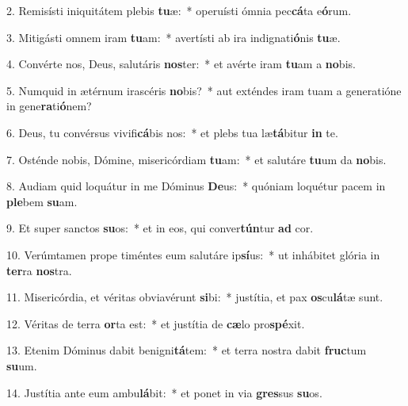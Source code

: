2. Remisísti iniquitátem plebis \textbf{tu}æ:~*  operuísti ómnia pec\textbf{cá}ta e\textbf{ó}rum.\

3. Mitigásti omnem iram \textbf{tu}am:~*  avertísti ab ira indignati\textbf{ó}nis \textbf{tu}æ.\

4. Convérte nos, Deus, salutáris \textbf{nos}ter:~*  et avérte iram \textbf{tu}am a \textbf{no}bis.\

5. Numquid in ætérnum irascéris \textbf{no}bis?~*  aut exténdes iram tuam a generatióne in gene\textbf{ra}ti\textbf{ó}nem?\

6. Deus, tu convérsus vivifi\textbf{cá}bis nos:~*  et plebs tua læ\textbf{tá}bitur \textbf{in} te.\

7. Osténde nobis, Dómine, misericórdiam \textbf{tu}am:~*  et salutáre \textbf{tu}um da \textbf{no}bis.\

8. Audiam quid loquátur in me Dóminus \textbf{De}us:~*  quóniam loquétur pacem in \textbf{ple}bem \textbf{su}am.\

9. Et super sanctos \textbf{su}os:~*  et in eos, qui conver\textbf{tún}tur \textbf{ad} cor.\

10. Verúmtamen prope timéntes eum salutáre ip\textbf{sí}us:~*  ut inhábitet glória in \textbf{ter}ra \textbf{nos}tra.\

11. Misericórdia, et véritas obviavérunt \textbf{si}bi:~*  justítia, et pax \textbf{os}cu\textbf{lá}tæ sunt.\

12. Véritas de terra \textbf{or}ta est:~*  et justítia de \textbf{cæ}lo pro\textbf{spé}xit.\

13. Etenim Dóminus dabit benigni\textbf{tá}tem:~*  et terra nostra dabit \textbf{fruc}tum \textbf{su}um.\

14. Justítia ante eum ambu\textbf{lá}bit:~*  et ponet in via \textbf{gres}sus \textbf{su}os.\

